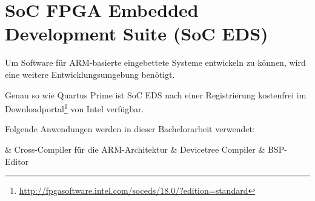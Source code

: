 \section{SoC FPGA Embedded Development Suite (SoC EDS)}
Um Software für \gls{ARM}-basierte eingebettete Systeme entwickeln zu können, wird eine weitere Entwicklungsumgebung benötigt.
 
Genau so wie Quartus Prime ist SoC EDS nach einer Registrierung kostenfrei im Downloadportal\footnote{\url{http://fpgasoftware.intel.com/soceds/18.0/?edition=standard}} von Intel verfügbar. 

Folgende Anwendungen werden in dieser Bachelorarbeit verwendet:
\begin{easylist}[itemize]
	& Cross-Compiler für die \gls{ARM}-Architektur
	& Devicetree Compiler
	& \gls{BSP}-Editor
\end{easylist}